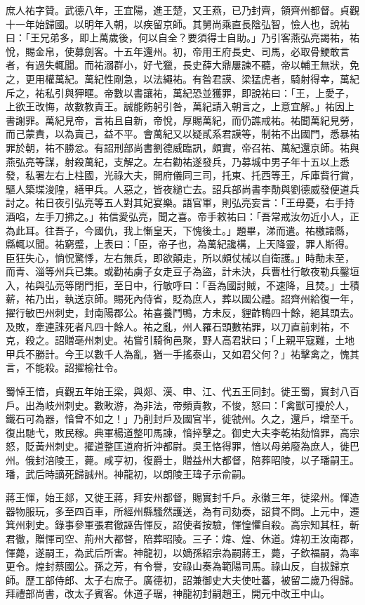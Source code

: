 \begin{pinyinscope}
 庶人祐字贊。武德八年，王宜陽，進王楚，又王燕，已乃封齊，領齊州都督。貞觀十一年始歸國。以明年入朝，以疾留京師。其舅尚乘直長陰弘智，憸人也，說祐曰：「王兄弟多，即上萬歲後，何以自全？要須得士自助。」乃引客燕弘亮謁祐，祐悅，賜金帛，使募劍客。十五年還州。初，帝用王府長史、司馬，必取骨鯁敢言者，有過失輒聞。而祐溺群小，好弋獵，長史薛大鼎屢諫不聽，帝以輔王無狀，免之，更用權萬紀。萬紀性剛急，以法繩祐。有昝君謨、梁猛虎者，騎射得幸，萬紀斥之，祐私引與狎暱。帝數以書讓祐，萬紀恐並獲罪，即說祐曰：「王，上愛子，上欲王改悔，故數教責王。誠能飭躬引咎，萬紀請入朝言之，上意宜解。」祐因上書謝罪。萬紀見帝，言祐且自新，帝悅，厚賜萬紀，而仍譙戒祐。祐聞萬紀見勞，而己蒙責，以為賣己，益不平。會萬紀又以疑貳系君謨等，制祐不出國門，悉暴祐罪於朝，祐不勝忿。有詔刑部尚書劉德威臨訊，頗實，帝召祐、萬紀還京師。祐與燕弘亮等謀，射殺萬紀，支解之。左右勸祐遂發兵，乃募城中男子年十五以上悉發，私署左右上柱國，光祿大夫，開府儀同三司，托東、托西等王，斥庫貲行賞，驅人築堞浚隍，繕甲兵。人惡之，皆夜縋亡去。詔兵部尚書李勣與劉德威發便道兵討之。祐日夜引弘亮等五人對其妃宴樂。語官軍，則弘亮妄言：「王毋憂，右手持酒啗，左手刀拂之。」祐信愛弘亮，聞之喜。帝手敕祐曰：「吾常戒汝勿近小人，正為此耳。往吾子，今國仇，我上慚皇天，下愧後土。」題畢，涕而遣。祐檄諸縣，縣輒以聞。祐窮蹙，上表曰：「臣，帝子也，為萬紀讒構，上天降靈，罪人斯得。臣狂失心，惝怳驚悸，左右無兵，即欲顛走，所以頗仗械以自衛護。」時勣未至，而青、淄等州兵已集。或勸祐虜子女走豆子為盜，計未決，兵曹杜行敏夜勒兵鑿垣入，祐與弘亮等閉門拒，至日中，行敏呼曰：「吾為國討賊，不速降，且焚。」士積薪，祐乃出，執送京師。賜死內侍省，貶為庶人，葬以國公禮。詔齊州給復一年，擢行敏巴州刺史，封南陽郡公。祐喜養鬥鴨，方未反，貍齚鴨四十餘，絕其頭去。及敗，牽連誅死者凡四十餘人。祐之亂，州人羅石頭數祐罪，以刀直前刺祐，不克，殺之。詔贈亳州刺史。祐嘗引騎徇邑聚，野人高君狀曰；「上親平寇難，土地甲兵不勝計。今王以數千人為亂，猶一手搖泰山，又如君父何？」祐擊禽之，愧其言，不能殺。詔擢榆社令。



 蜀悼王愔，貞觀五年始王梁，與郯、漢、申、江、代五王同封。徙王蜀，實封八百戶。出為岐州刺史。數畋游，為非法，帝頻責教，不悛，怒曰：「禽獸可擾於人，鐵石可為器，愔曾不如之！」乃削封戶及國官半，徙虢州。久之，還戶，增至千。復出馳弋，敗民稼。典軍楊道整叩馬諫，愔捽擊之。御史大夫李乾祐劾愔罪，高宗怒，貶黃州刺史。擢道整匡道府折沖都尉。吳王恪得罪，愔以母弟廢為庶人，徙巴州。俄封涪陵王，薨。咸亨初，復爵士，贈益州大都督，陪葬昭陵，以子璠嗣王。璠，武后時謫死歸誠州。神龍初，以朗陵王瑋子示俞嗣。



 蔣王惲，始王郯，又徙王蔣，拜安州都督，賜實封千戶。永徽三年，徙梁州。惲造器物服玩，多至四百車，所經州縣騷然護送，為有司劾奏，詔貸不問。上元中，遷箕州刺史。錄事參軍張君徹誣告惲反，詔使者按驗，惲惶懼自殺。高宗知其枉，斬君徹，贈惲司空、荊州大都督，陪葬昭陵。三子：煒、煌、休道。煒初王汝南郡，惲薨，遂嗣王，為武后所害。神龍初，以嫡孫紹宗為嗣蔣王，薨，子欽福嗣，為率更令。煌封蔡國公。孫之芳，有令譽，安祿山奏為範陽司馬。祿山反，自拔歸京師。歷工部侍郎、太子右庶子。廣德初，詔兼御史大夫使吐蕃，被留二歲乃得歸。拜禮部尚書，改太子賓客。休道子琚，神龍初封嗣趙王，開元中改王中山。




\end{pinyinscope}
